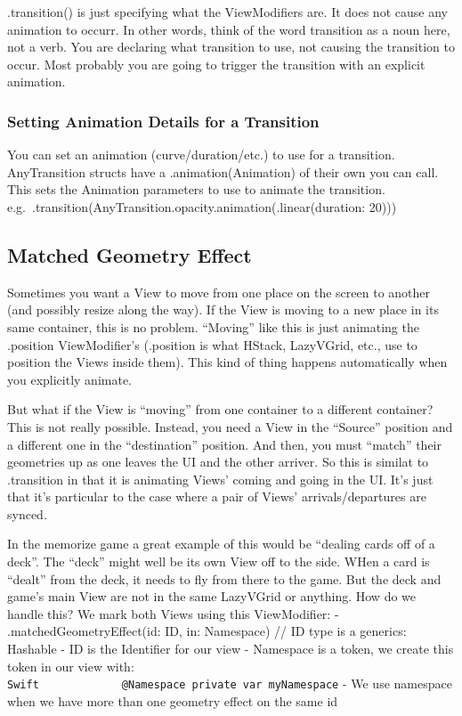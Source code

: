\documentclass[]{article}
\begin{document}
.transition() is just specifying what the ViewModifiers are. It does not
cause any animation to occurr. In other words, think of the word
transition as a noun here, not a verb. You are declaring what transition
to use, not causing the transition to occur. Most probably you are going
to trigger the transition with an explicit animation.

\hypertarget{setting-animation-details-for-a-transition}{%
\subsubsection{Setting Animation Details for a
Transition}\label{setting-animation-details-for-a-transition}}

You can set an animation (curve/duration/etc.) to use for a transition.
AnyTransition structs have a .animation(Animation) of their own you can
call. This sets the Animation parameters to use to animate the
transition.
e.g.~.transition(AnyTransition.opacity.animation(.linear(duration: 20)))

\hypertarget{matched-geometry-effect}{%
\subsection{Matched Geometry Effect}\label{matched-geometry-effect}}

Sometimes you want a View to move from one place on the screen to
another (and possibly resize along the way). If the View is moving to a
new place in its same container, this is no problem. ``Moving'' like
this is just animating the .position ViewModifier's (.position is what
HStack, LazyVGrid, etc., use to position the Views inside them). This
kind of thing happens automatically when you explicitly animate.

But what if the View is ``moving'' from one container to a different
container? This is not really possible. Instead, you need a View in the
``Source'' position and a different one in the ``destination'' position.
And then, you must ``match'' their geometries up as one leaves the UI
and the other arriver. So this is similat to .transition in that it is
animating Views' coming and going in the UI. It's just that it's
particular to the case where a pair of Views' arrivals/departures are
synced.

In the memorize game a great example of this would be ``dealing cards
off of a deck''. The ``deck'' might well be its own View off to the
side. WHen a card is ``dealt'' from the deck, it needs to fly from there
to the game. But the deck and game's main View are not in the same
LazyVGrid or anything. How do we handle this? We mark both Views using
this ViewModifier: - .matchedGeometryEffect(id: ID, in: Namespace) // ID
type is a generics: Hashable - ID is the Identifier for our view -
Namespace is a token, we create this token in our view with:
\texttt{Swift\ \ \ \ \ \ \ \ \ \ \ \ \ @Namespace\ private\ var\ myNamespace}
- We use namespace when we have more than one geometry effect on the
same id
\end{document}
